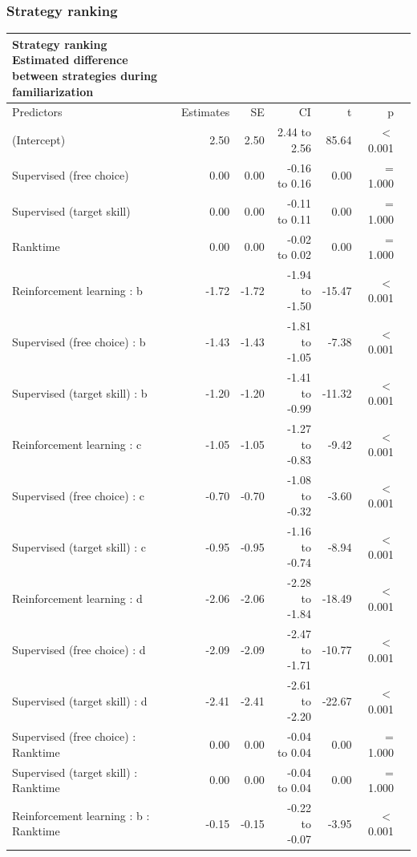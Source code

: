 \documentclass[pdflatex,sn-mathphys-num]{sn-jnl}%
\theoremstyle{thmstyleone}%
\theoremstyle{thmstyletwo}%
\theoremstyle{thmstylethree}%
\begin{document}
\begin{appendices}
\subsubsection{Strategy ranking}\label{suptable_strategyranking}
\clearpage

\setlength{\LTpost}{0mm}
\begin{longtable}{lrrrrrl}\label{suptable_strategyranking_strategydifffam}
\caption*{
{\large Strategy ranking} \\ 
{\small Estimated difference between strategies during familiarization}
} \\ 
\toprule
Predictors & Estimates & SE & CI & t & p \\ 
\midrule\addlinespace[2.5pt]
(Intercept) & 2.50 & 2.50 & 2.44 to 2.56 & 85.64 &  $<$  0.001 \\ 
Supervised (free choice) & 0.00 & 0.00 & -0.16 to 0.16 & 0.00 &  =  1.000 \\ 
Supervised (target skill) & 0.00 & 0.00 & -0.11 to 0.11 & 0.00 &  =  1.000 \\ 
Ranktime & 0.00 & 0.00 & -0.02 to 0.02 & 0.00 &  =  1.000 \\ 
Reinforcement learning : b & -1.72 & -1.72 & -1.94 to -1.50 & -15.47 &  $<$  0.001 \\ 
Supervised (free choice) : b & -1.43 & -1.43 & -1.81 to -1.05 & -7.38 &  $<$  0.001 \\ 
Supervised (target skill) : b & -1.20 & -1.20 & -1.41 to -0.99 & -11.32 &  $<$  0.001 \\ 
Reinforcement learning : c & -1.05 & -1.05 & -1.27 to -0.83 & -9.42 &  $<$  0.001 \\ 
Supervised (free choice) : c & -0.70 & -0.70 & -1.08 to -0.32 & -3.60 &  $<$  0.001 \\ 
Supervised (target skill) : c & -0.95 & -0.95 & -1.16 to -0.74 & -8.94 &  $<$  0.001 \\ 
Reinforcement learning : d & -2.06 & -2.06 & -2.28 to -1.84 & -18.49 &  $<$  0.001 \\ 
Supervised (free choice) : d & -2.09 & -2.09 & -2.47 to -1.71 & -10.77 &  $<$  0.001 \\ 
Supervised (target skill) : d & -2.41 & -2.41 & -2.61 to -2.20 & -22.67 &  $<$  0.001 \\ 
Supervised (free choice) : Ranktime & 0.00 & 0.00 & -0.04 to 0.04 & 0.00 &  =  1.000 \\ 
Supervised (target skill) : Ranktime & 0.00 & 0.00 & -0.04 to 0.04 & 0.00 &  =  1.000 \\ 
Reinforcement learning : b : Ranktime & -0.15 & -0.15 & -0.22 to -0.07 & -3.95 &  $<$  0.001 \\ 

\end{longtable}
\end{appendices}
\end{document}
